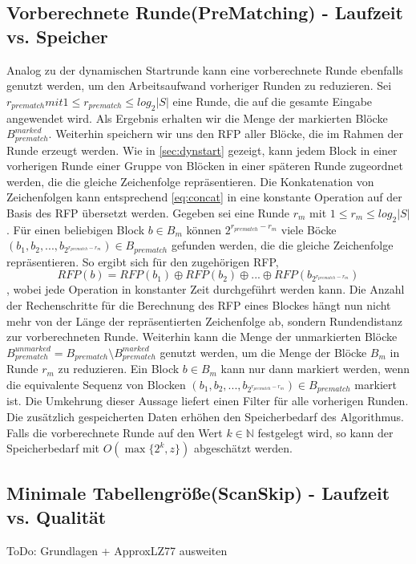 \subsection{Vorberechnete Runde(PreMatching) - Laufzeit vs. Speicher}
Analog zu der dynamischen Startrunde kann eine vorberechnete Runde ebenfalls genutzt werden, um den Arbeitsaufwand vorheriger Runden zu reduzieren. Sei $r_{prematch} mit 
1\leq r_{prematch} \leq log_2{|S|}$ eine Runde, die auf die gesamte Eingabe angewendet wird. Als Ergebnis erhalten wir die Menge der markierten Blöcke $B_{prematch}^{marked}$.
Weiterhin speichern wir uns den RFP aller Blöcke, die im Rahmen der Runde erzeugt werden. Wie in \ref{sec:dynstart} gezeigt, kann jedem Block in einer vorherigen Runde einer Gruppe
von Blöcken in einer späteren Runde zugeordnet werden, die die gleiche Zeichenfolge repräsentieren. Die Konkatenation von Zeichenfolgen kann entsprechend \ref{eq:concat} in eine
konstante Operation auf der Basis des RFP übersetzt werden. Gegeben sei eine Runde $r_m$ mit $1\leq r_m \leq log_2{|S|}$. Für einen beliebigen Block $b \in B_m$ können $2^{r_{prematch}-r_m}$
viele Böcke $(b_1, b_2, ..., b_{2^{r_{prematch}-r_m}})\in B_{prematch}$ gefunden werden, die die gleiche Zeichenfolge repräsentieren. So ergibt sich für den zugehörigen RFP,
\begin{equation}
    RFP(b) = RFP(b_1) \oplus RFP(b_2) \oplus ... \oplus RFP(b_{2^{r_{prematch}-r_m}})
\end{equation}
, wobei jede Operation in konstanter Zeit durchgeführt werden kann. Die Anzahl der Rechenschritte für die Berechnung des RFP eines Blockes hängt nun nicht mehr von der Länge der
repräsentierten Zeichenfolge ab, sondern Rundendistanz zur vorberechneten Runde.
Weiterhin kann die Menge der unmarkierten Blöcke $B_{prematch}^{unmarked}=B_{prematch}\setminus B_{prematch}^{marked}$ genutzt werden, um die Menge der Blöcke $B_m$ in Runde $r_m$
zu reduzieren. Ein Block $b \in B_m$ kann nur dann markiert werden, wenn die equivalente Sequenz von Blocken $(b_1, b_2, ..., b_{2^{r_{prematch}-r_m}})\in B_{prematch}$ markiert ist.
Die Umkehrung dieser Aussage liefert einen Filter für alle vorherigen Runden. Die zusätzlich gespeicherten Daten erhöhen den Speicherbedarf des Algorithmus. Falls die vorberechnete
Runde auf den Wert $k\in \mathbb{N}$ festgelegt wird, so kann der Speicherbedarf mit $O(\max\{2^k, z\})$ abgeschätzt werden.

\subsection{Minimale Tabellengröße(ScanSkip) - Laufzeit vs. Qualität}
ToDo: Grundlagen + ApproxLZ77 ausweiten
